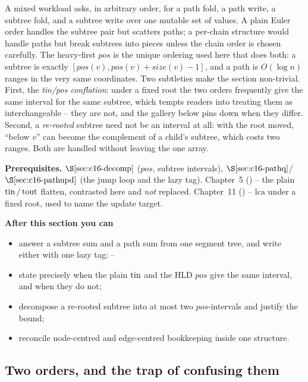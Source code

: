 \begin{topicintro}
A mixed workload asks, in arbitrary order, for a path fold, a path write, a subtree fold, and a subtree write over one mutable set of values.  A plain Euler order handles the subtree pair but scatters paths; a per-chain structure would handle paths but break subtrees into pieces unless the chain order is chosen carefully.  The heavy-first \(\mathit{pos}\) is the unique ordering used here that does both: a subtree is exactly \([\mathit{pos}(v),\mathit{pos}(v)+\mathit{size}(v)-1]\), and a path is \(O(\log n)\) ranges in the very same coordinates.  Two subtleties make the section non-trivial.  First, the \emph{tin/pos conflation}: under a fixed root the two orders frequently give the same interval for the same subtree, which tempts readers into treating them as interchangeable -- they are not, and the gallery below pins down when they differ.  Second, a \emph{re-rooted} subtree need not be an interval at all: with the root moved, ``below \(v\)'' can become the complement of a child's subtree, which costs two ranges.  Both are handled without leaving the one array.

\textbf{Prerequisites.} \(\secref{c16-decomp}\) (\(\mathit{pos}\), subtree intervals), \(\secref{c16-pathq}\)/\(\secref{c16-pathupd}\) (the jump loop and the lazy tag).  Chapter~5 () -- the plain \(\operatorname{tin}/\operatorname{tout}\) flatten, contrasted here and \emph{not} replaced.  Chapter~11 () -- \(\mathrm{lca}\) under a fixed root, used to name the update target.

\textbf{After this section you can}
\begin{itemize}[nosep]
  \item answer a subtree sum and a path sum from one segment tree, and write either with one lazy tag; \hfill{}--
  \item state precisely when the plain \(\operatorname{tin}\) and the HLD \(\mathit{pos}\) give the same interval, and when they do not; \hfill{}
  \item decompose a re-rooted subtree into at most two \(\mathit{pos}\)-intervals and justify the bound; \hfill{}
  \item reconcile node-centred and edge-centred bookkeeping inside one structure. \hfill{}
\end{itemize}
\end{topicintro}

\subsection{Two orders, and the trap of confusing them}

